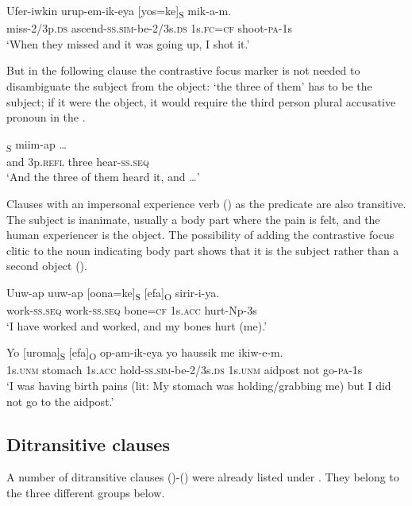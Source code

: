 \ea%
\label{ex:x938}
\gll Ufer-iwkin  urup-em-ik-eya  [yos=ke]\textsubscript{S}  mik-a-m. \\
     miss-2/3p.\textsc{ds}  ascend-\textsc{ss}.\textsc{sim}-be-2/3s.\textsc{ds}  1s.\textsc{fc}=\textsc{cf}  shoot-\textsc{pa}-1s \\
\glt `When they missed and it was going up, I shot it.'
\z

But in the following clause the contrastive focus marker is not needed to disambiguate the subject from the object:  `the three of them' has to be the subject; if it were the object, it would require the third person plural accusative pronoun  in the .

\ea%
\label{ex:x940}
\textsubscript{S}  miim-ap  {\dots} \\
     and  3p.\textsc{refl}  three  hear-\textsc{ss}.\textsc{seq} \\
\glt `And the three of them heard it, and {\dots}'
\z

Clauses with an impersonal experience verb () as the predicate are also transitive. The subject is inanimate, usually a body part where the pain is felt, and the human experiencer is the object. The possibility of adding the contrastive focus clitic to the noun indicating body part shows that it is the subject rather than a second object ().

\ea%
\label{ex:x1012}
\gll Uuw-ap  uuw-ap  [oona=ke]\textsubscript{S}  [efa]\textsubscript{O}  sirir-i-ya. \\
     work-\textsc{ss}.\textsc{seq}  work-\textsc{ss}.\textsc{seq}  bone=\textsc{cf}  1s.\textsc{acc}  hurt-Np-3s \\
\glt `I have worked and worked, and my bones hurt (me).'
\z

\ea%
\label{ex:x1015}
\gll Yo  [uroma]\textsubscript{S}  [efa]\textsubscript{O}  op-am-ik-eya  yo  haussik me  ikiw-e-m. \\
     1s.\textsc{unm}  stomach  1s.\textsc{acc}  hold-\textsc{ss}.\textsc{sim}-be-2/3s.\textsc{ds}  1s.\textsc{unm}  aidpost not  go-\textsc{pa}-1s \\
\glt `I was having birth pains (lit: My stomach was holding/grabbing me) but I did not go to the aidpost.'
\z

\subsection{Ditransitive clauses}
{}
A number of ditransitive clauses ()-() were already listed under . They belong to the three different groups below.

